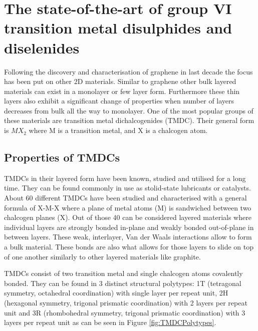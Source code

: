 \chapter{The state-of-the-art of group VI transition metal disulphides and diselenides}
\label{sec:Introduction}

Following the discovery and characterisation of graphene in last decade the focus has been put on other 2D materials. Similar to graphene other bulk layered materials can exist in a monolayer or few layer form. Furthermore these thin layers also exhibit a significant change of properties when number of layers decreases from bulk all the way to monolayer. One of the most popular groups of these materials are transition metal dichalcogenides (TMDC). Their general form is $MX_2$ where M is a transition metal, and X is a chalcogen atom.  

\section{Properties of TMDCs}
TMDCs in their layered form have been known, studied and utilised for a long time. They can be found commonly in use as stolid-state lubricants or catalysts. About 60 different TMDCs have been studied and characterised with a general formula of X-M-X where a plane of metal atoms (M) is sandwiched between two chalcogen planes (X). Out of those 40 can be considered layered materials where individual layers are strongly bonded in-plane and weakly bonded out-of-plane in between layers. These weak, interlayer, Van der Waals interactions allow to form a bulk material. These bonds are also what allows for those layers to slide on top of one another similarly to other layered materials like graphite. 

TMDCs consist of two transition metal and single chalcogen atoms covalently bonded. They can be found in 3 distinct structural polytypes: 1T (tetragonal symmetry, octahedral coordination) with single layer per repeat unit, 2H (hexagonal symmetry, trigonal prismatic coordination) with 2 layers per repeat unit and 3R (rhombohedral symmetry, trigonal prismatic coordination) with 3 layers per repeat unit \cite{ElectronicsAndOptoelectronicsOfTwo-dimensionalTransitionMetalDichalcogenides} as can be seen in Figure \ref{fig:TMDCPolytypes}.
	
